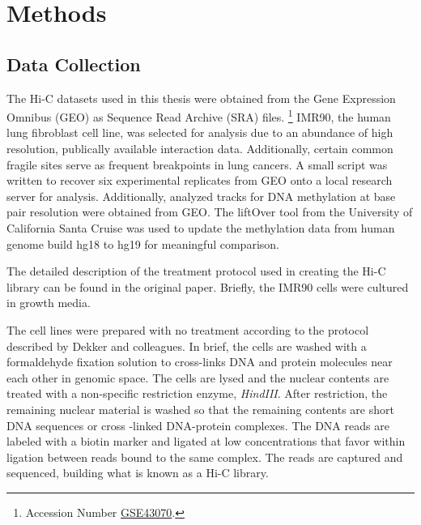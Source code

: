 \documentclass[phd,tocprelim]{cornell}
\begin{document}


\chapter{Methods}

\section{Data Collection}

The Hi-C datasets used in this thesis were obtained from the Gene
Expression Omnibus (GEO)\cite{edgar2002} as Sequence Read Archive (SRA) files.%
\footnote{Accession Number \href{http://www.ncbi.nlm.nih.gov/geo/query/acc.cgi?acc=GSE43070}{GSE43070}.}
IMR90, the human lung fibroblast cell line, was selected for analysis due to
an abundance of high resolution, publically available interaction data.
Additionally, certain common fragile sites serve as frequent breakpoints in
lung cancers\cite{tunca2002}\cite{dhillon2003}.  A small script was written to
recover six experimental replicates from GEO onto a local research server for
analysis.  Additionally, analyzed tracks for DNA methylation at base pair
resolution were obtained from GEO\cite{lister2009}.  The liftOver tool from
the University of California Santa Cruise was used to update the methylation
data from human genome build hg18 to hg19 for meaningful comparison\cite{hinrichs2006}.

The detailed description of the treatment protocol used in creating the Hi-C
library can be found in the original paper\cite{ren2013}.  Briefly, the IMR90
cells were cultured in growth media.

The cell lines were prepared with no treatment according to the protocol
described by Dekker and colleagues\cite{dekker2013}.  In brief, the cells
are washed with a formaldehyde fixation solution to cross-links
DNA and protein molecules near each other in genomic space.  The cells are
lysed and the nuclear contents are treated with a non-specific restriction
enzyme, \textit{HindIII}.  After restriction, the remaining nuclear material
is washed so that the remaining contents are short DNA sequences or cross
-linked DNA-protein complexes.  The DNA reads are labeled with a biotin
marker and ligated at low concentrations that favor within ligation between
reads bound to the same complex.  The reads are captured and sequenced,
building what is known as a Hi-C library.
\end{document}
